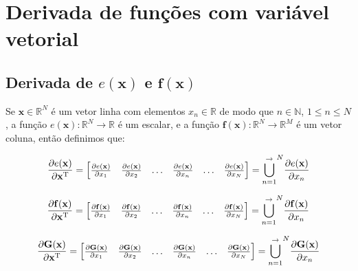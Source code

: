 
\chapter{Derivada de funções com variável vetorial}

\section{Derivada de $e(\mathbf{x})$ e $\mathbf{f}(\mathbf{x})$}

\begin{definition}\label{def:deltahor}
Se 
$\mathbf{x}\in \mathbb{R}^N$ é um vetor linha com elementos $x_n\in \mathbb{R}$ de modo que
$n\in \mathbb{N}$, $1 \leq n \leq N$, 
a função $e(\mathbf{x}): \mathbb{R}^N \rightarrow \mathbb{R}$ é um escalar, e
a função $\mathbf{f}(\mathbf{x}): \mathbb{R}^N \rightarrow \mathbb{R}^M$ é um vetor coluna, 
então definimos que:

\begin{equation}
\frac{\partial e(\mathbf{x}) }{\partial \mathbf{x}^{\mathrm{T}}}= 
\left[
\begin{matrix}
\frac{\partial e(\mathbf{x}) }{\partial x_{1}}&
\frac{\partial e(\mathbf{x}) }{\partial x_{2}}&
\hdots&
\frac{\partial e(\mathbf{x}) }{\partial x_{n}}&
\hdots&
\frac{\partial e(\mathbf{x}) }{\partial x_{N}}
\end{matrix}
\right]= {\bigcup\limits_{n=1}^{\rightarrow}}^{N}{\frac{\partial e(\mathbf{x}) }{\partial x_{n}}} 
\end{equation}

\begin{equation}
\frac{\partial \mathbf{f}(\mathbf{x}) }{\partial \mathbf{x}^{\mathrm{T}}}= 
\left[
\begin{matrix}
\frac{\partial \mathbf{f}(\mathbf{x}) }{\partial x_{1}}&
\frac{\partial \mathbf{f}(\mathbf{x}) }{\partial x_{2}}&
\hdots&
\frac{\partial \mathbf{f}(\mathbf{x}) }{\partial x_{n}}&
\hdots&
\frac{\partial \mathbf{f}(\mathbf{x}) }{\partial x_{N}}
\end{matrix}
\right]= {\bigcup\limits_{n=1}^{\rightarrow}}^{N}{\frac{\partial \mathbf{f}(\mathbf{x}) }{\partial x_{n}}} 
\end{equation}

\begin{equation}
\frac{\partial \mathbf{G}(\mathbf{x}) }{\partial \mathbf{x}^{\mathrm{T}}}= 
\left[
\begin{matrix}
\frac{\partial \mathbf{G}(\mathbf{x}) }{\partial x_{1}}&
\frac{\partial \mathbf{G}(\mathbf{x}) }{\partial x_{2}}&
\hdots&
\frac{\partial \mathbf{G}(\mathbf{x}) }{\partial x_{n}}&
\hdots&
\frac{\partial \mathbf{G}(\mathbf{x}) }{\partial x_{N}}
\end{matrix}
\right]= {\bigcup\limits_{n=1}^{\rightarrow}}^{N}{\frac{\partial \mathbf{G}(\mathbf{x}) }{\partial x_{n}}} 
\end{equation}
\end{definition}

